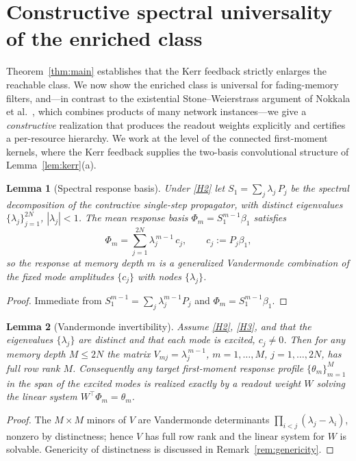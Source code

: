 \documentclass[11pt]{article}
\newtheorem{lemma}{Lemma}
\theoremstyle{remark}
\begin{document}
\section{Constructive spectral universality of the enriched class}
\label{sec:universality}

Theorem~\ref{thm:main} establishes that the Kerr feedback strictly enlarges the
reachable class. We now show the enriched class is universal for fading-memory
filters, and---in contrast to the existential Stone--Weierstrass argument of
Nokkala et al.~\cite{nokkala2021}, which combines products of many network
instances---we give a \emph{constructive} realization that produces the readout
weights explicitly and certifies a per-resource hierarchy. We work at the level
of the connected first-moment kernels, where the Kerr feedback supplies the
two-basis convolutional structure of Lemma~\ref{lem:kerr}(a).

\begin{lemma}[Spectral response basis]\label{lem:spectral}
Under \ref{H2} let $S_1=\sum_{j} \lambda_j\,P_j$ be the spectral decomposition of
the contractive single-step propagator, with distinct eigenvalues
$\{\lambda_j\}_{j=1}^{2N}$, $|\lambda_j|<1$. The mean response basis
$\Phi_m=S_1^{m-1}\beta_1$ satisfies
\[
\Phi_m = \sum_{j=1}^{2N} \lambda_j^{\,m-1}\,c_j,\qquad c_j := P_j\beta_1,
\]
so the response at memory depth $m$ is a generalized Vandermonde combination of
the fixed mode amplitudes $\{c_j\}$ with nodes $\{\lambda_j\}$.
\end{lemma}

\begin{proof}
Immediate from $S_1^{m-1}=\sum_j\lambda_j^{m-1}P_j$ and $\Phi_m=S_1^{m-1}\beta_1$.
\end{proof}

\begin{lemma}[Vandermonde invertibility]\label{lem:vand}
Assume \ref{H2}, \ref{H3}, and that the eigenvalues $\{\lambda_j\}$ are distinct
and that each mode is excited, $c_j\neq0$. Then for any memory depth $M\le2N$ the
matrix $V_{mj}=\lambda_j^{\,m-1}$, $m=1,\dots,M$, $j=1,\dots,2N$, has full row
rank $M$. Consequently any target first-moment response profile
$\{\theta_m\}_{m=1}^M$ in the span of the excited modes is realized exactly by a
readout weight $W$ solving the linear system $W^\top \Phi_m=\theta_m$.
\end{lemma}

\begin{proof}
The $M\times M$ minors of $V$ are Vandermonde determinants
$\prod_{i<j}(\lambda_j-\lambda_i)$, nonzero by distinctness; hence $V$ has full
row rank and the linear system for $W$ is solvable. Genericity of distinctness is
discussed in Remark~\ref{rem:genericity}.
\end{proof}
\end{document}

